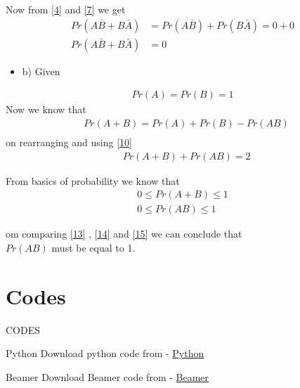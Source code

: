 \documentclass{beamer}
\begin{document}
\begin{frame}
    Now from \eqref{4} and \eqref{7} we get
    \begin{align}
        Pr(A\bar{B} + B\bar{A}) &=  Pr(A\bar{B}) + Pr(B\bar{A}) = 0 + 0 \\
        Pr(A\bar{B} + B\bar{A}) &= 0
    \end{align}

    \begin{itemize}
        \item b) Given
    \end{itemize}
    \begin{align} \label{10}
         Pr(A) = Pr(B) = 1
    \end{align}
    Now we know that 
    \begin{align}
       & Pr(A+B)  = Pr(A) + Pr(B) - Pr(AB) \\
    \end{align}
    on rearranging and using \eqref{10}
    \begin{align}\label{13}
        & Pr(A+B) + Pr(AB) = 2 
    \end{align}

\end{frame}

\begin{frame}
    From basics of probability we know that
    \begin{align}\label{14}
        0 \le Pr(A+B) \le 1 \\ \label{15}
        0 \le Pr(AB) \le 1  
    \end{align}

    om comparing \eqref{13} , \eqref{14} and \eqref{15} we can conclude that \\
    $Pr(AB)$ must be equal to 1.
\end{frame}

\section{Codes}
\begin{frame}{CODES}
    \begin{block}{Python}
         Download python code from - \href{https://github.com/jarpula-Bhanu/Assignment-7/blob/main/code/verify.py}{Python}
    \end{block}

 \begin{block}{Beamer}
         Download Beamer code from - \href{https://github.com/jarpula-Bhanu/Assignment-7/blob/main/Beamer.tex}{Beamer}
    \end{block}
\end{frame} 
\end{document}
